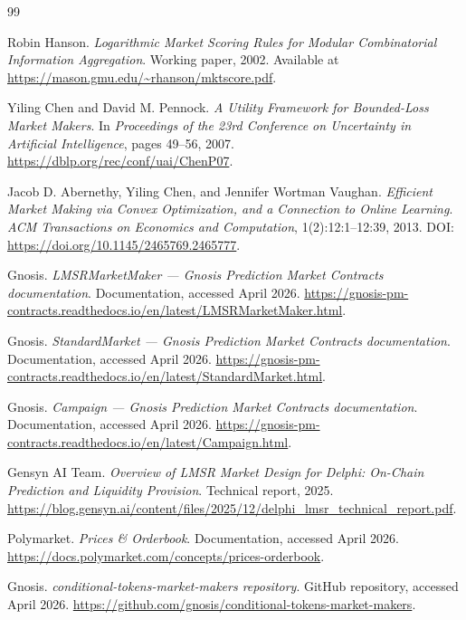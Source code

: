 \documentclass[10pt]{article}
\begin{document}
\begin{thebibliography}{99}

Robin Hanson.
\newblock \emph{Logarithmic Market Scoring Rules for Modular Combinatorial Information Aggregation}.
\newblock Working paper, 2002.
\newblock Available at \url{https://mason.gmu.edu/~rhanson/mktscore.pdf}.

Yiling Chen and David M. Pennock.
\newblock \emph{A Utility Framework for Bounded-Loss Market Makers}.
\newblock In \emph{Proceedings of the 23rd Conference on Uncertainty in Artificial Intelligence}, pages 49--56, 2007.
\newblock \url{https://dblp.org/rec/conf/uai/ChenP07}.

Jacob D. Abernethy, Yiling Chen, and Jennifer Wortman Vaughan.
\newblock \emph{Efficient Market Making via Convex Optimization, and a Connection to Online Learning}.
\newblock \emph{ACM Transactions on Economics and Computation}, 1(2):12:1--12:39, 2013.
\newblock DOI: \url{https://doi.org/10.1145/2465769.2465777}.

Gnosis.
\newblock \emph{LMSRMarketMaker --- Gnosis Prediction Market Contracts documentation}.
\newblock Documentation, accessed April 2026.
\newblock \url{https://gnosis-pm-contracts.readthedocs.io/en/latest/LMSRMarketMaker.html}.

Gnosis.
\newblock \emph{StandardMarket --- Gnosis Prediction Market Contracts documentation}.
\newblock Documentation, accessed April 2026.
\newblock \url{https://gnosis-pm-contracts.readthedocs.io/en/latest/StandardMarket.html}.

Gnosis.
\newblock \emph{Campaign --- Gnosis Prediction Market Contracts documentation}.
\newblock Documentation, accessed April 2026.
\newblock \url{https://gnosis-pm-contracts.readthedocs.io/en/latest/Campaign.html}.

Gensyn AI Team.
\newblock \emph{Overview of LMSR Market Design for Delphi: On-Chain Prediction and Liquidity Provision}.
\newblock Technical report, 2025.
\newblock \url{https://blog.gensyn.ai/content/files/2025/12/delphi_lmsr_technical_report.pdf}.

Polymarket.
\newblock \emph{Prices \& Orderbook}.
\newblock Documentation, accessed April 2026.
\newblock \url{https://docs.polymarket.com/concepts/prices-orderbook}.

Gnosis.
\newblock \emph{conditional-tokens-market-makers repository}.
\newblock GitHub repository, accessed April 2026.
\newblock \url{https://github.com/gnosis/conditional-tokens-market-makers}.


\end{thebibliography}
\end{document}
